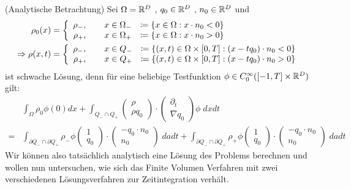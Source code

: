 \begin{remark}(Analytische Betrachtung) \newline
Sei $\Omega = \mathbb{R} ^D$ , $q_0 \in \mathbb{R} ^D$ , $n_0 \in \mathbb{R} ^D$ und 
	\begin{align*}
		\rho_0 (x) &= 
			\left\{              
				\begin{array}{r l}
					\rho_- , \qquad x \in \Omega_- &\coloneqq \{x \in \Omega : x \cdot n_0 < 0 \} \\
					\rho_+ , \qquad x \in \Omega_+ &\coloneqq \{x \in \Omega : x \cdot n_0 > 0 \}
				\end{array}
			\right.  \\
			\Rightarrow \rho (x,t) &= 
				\left\{              
					\begin{array}{r l}
						\rho_- , \qquad x \in Q_- &\coloneqq \{(x,t) \in \Omega \times [0,T] : (x - tq_0) \cdot n_0 < 0 \} \\
						\rho_+ , \qquad x \in Q_+ &\coloneqq \{(x,t) \in \Omega \times [0,T] : (x - tq_0) \cdot n_0 > 0 \} 
					\end{array}
				\right. 
	\end{align*}
	ist schwache Lösung, denn für eine beliebige Testfunktion $\phi \in C_0^{\infty} ([-1,T] \times \mathbb{R}^D)$ gilt:
	\begin{align*}
		&\int_{\Omega} \rho_0 \phi (0) dx + \int_{Q_- \cap Q_+ } 
				\begin{pmatrix}
       				\rho \\
       				\rho q_0
     			\end{pmatrix}
     		\cdot
     			\begin{pmatrix}
       				\partial_t \\
       				\nabla q_0
     			\end{pmatrix}
     		\phi \; dxdt  \\
     	= &\int_{ \partial Q_- \cap \partial Q_+ } \rho_- \phi
     		\begin{pmatrix}
       				1 \\
       				q_0
     			\end{pmatrix}
     		\cdot
     			\begin{pmatrix}
       				-q_0 \cdot n_0 \\
       				n_0
     			\end{pmatrix} 
     		\; da dt
     	+ \int_{ \partial Q_- \cap \partial Q_+ } \rho_+ \phi
     		\begin{pmatrix}
       				1 \\
       				q_0
     			\end{pmatrix}
     		\cdot
     			\begin{pmatrix}
       				-q_0 \cdot n_0 \\
       				n_0
     			\end{pmatrix} 
     		\; da dt	
	\end{align*}
	Wir können also tatsächlich analytisch eine Lösung des Problems berechnen und wollen nun untersuchen, wie sich das Finite Volumen Verfahren mit zwei verschiedenen Lösungsverfahren zur Zeitintegration verhält. 
	\end{remark} 

